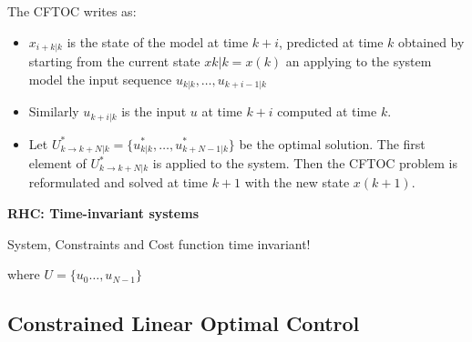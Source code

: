 \documentclass[8pt,a4paper]{scrartcl}
\begin{document}
\begin{multicols*}{3}
\begin{multicols*}{4}
{The CFTOC writes as:


\begin{itemize}

\item $x_{i+k|k}$ is the state of the model at time $k+i$, predicted at time $k$ obtained by starting from the current state $x{k|k}=x(k)$ an applying to the system model the input sequence $u_{k|k},\ldots, u_{k+i-1|k}$
\item Similarly $u_{k+i|k}$ is the input $u$ at time $k+i$ computed at time $k$.
\item Let $U^\ast_{k\rightarrow k+N|k}=\{u_{k|k}^\ast,\ldots,u_{k+N-1|k}^\ast\}$ be the optimal solution. The first element of $U_{k\rightarrow k+N|k}^\ast$ is applied to the system. Then the CFTOC problem is reformulated and solved at time $k+1$ with the new state $x(k+1)$.
\end{itemize}



\textbf{RHC: Time-invariant systems}

System, Constraints and Cost function time invariant!


where $U=\{u_0\ldots,u_{N-1}\}$

\subsection{Constrained Linear Optimal Control}

}
\end{multicols*}
\end{multicols*}
\end{document}
